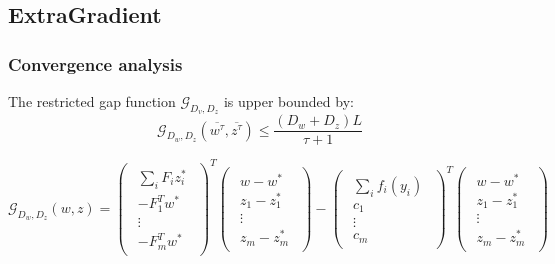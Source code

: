 \subsection*{ExtraGradient}
\subsubsection*{Convergence analysis}
The restricted gap function
$\mathcal{G}_{D_{ v}, D_{ z}}$ is upper bounded by:
\begin{equation}
  \mathcal{G}_{D_{ w}, D_{ z}}(\overline{ w^{\tau}},
\overline{ z^{\tau}}) \leq \frac{\left( D_{ w} + D_{ z} \right)
L}{\tau + 1}
\label{eq:ub}
\end{equation}

\begin{equation*}
    \mathcal{G}_{D_{ w},D_{ z}}( w,  z)
    =
    \begin{pmatrix}
      \begin{array}{c}
        \sum_i  F_i  z_i^*\\
	- F_1^T  w^*\\
	\vdots\\
	- F_m^T  w^*
      \end{array}
    \end{pmatrix}^T
    \begin{pmatrix}
      \begin{array}{c}
	 w -  w^*\\
	 z_1 -  z_1^*\\
	\vdots\\
	 z_m -  z_m^*
      \end{array}
    \end{pmatrix} -
    \begin{pmatrix}
      \begin{array}{c}
	\sum_i  f_i( y_i)\\
	 c_1\\
	\vdots\\
	 c_m
      \end{array}
    \end{pmatrix}^T
    \begin{pmatrix}
      \begin{array}{c}
	 w -  w^*\\
	 z_1 -  z_1^*\\
	\vdots\\
	 z_m -  z_m^*
      \end{array}
    \end{pmatrix}
\end{equation*}

